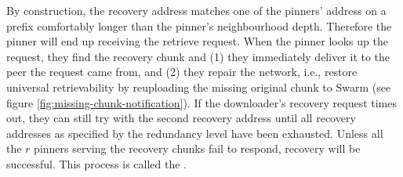 By construction, the recovery address matches one of the pinners' address on a prefix comfortably longer than the pinner's neighbourhood depth. Therefore the pinner will end up receiving the retrieve request. When the pinner looks up the request, they find the recovery chunk and (1) they immediately deliver it to the peer the request came from, and (2) they repair the network, i.e., restore universal retrievability by reuploading the missing original chunk to Swarm (see figure \ref{fig:missing-chunk-notification}).  If the downloader's recovery request times out, they can still try with the second recovery address until all recovery addresses as specified by the redundancy level have been exhausted. Unless all the $r$ pinners serving the recovery chunks fail to respond, recovery will be successful. This process is called the .
